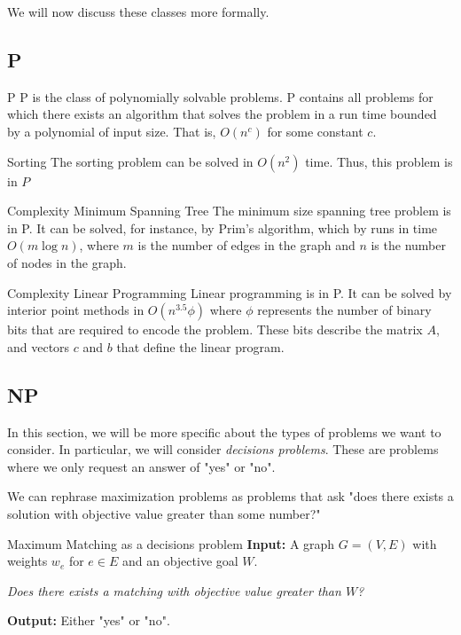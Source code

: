 We will now discuss these classes more formally.
\subsection{P}
\begin{definition}{P}{}
P is the class of polynomially solvable problems.  P contains all problems for which there exists an algorithm that solves the problem in a run time bounded by a polynomial of input size. That is, $O(n^c)$ for some constant $c$.
\end{definition}

\begin{example}{Sorting}{}
The sorting problem can be solved in $O(n^2)$ time.  Thus, this problem is in $P$
\end{example}

\begin{example}{Complexity Minimum Spanning Tree}{}
The minimum size spanning tree problem is in P.  It can be solved, for instance, by Prim's algorithm, which  by runs in time $O(m \log n)$, where $m$ is the number of edges in the graph and $n$ is the number of nodes in the graph.  
\end{example}
\begin{example}{Complexity Linear Programming}{}
Linear programming is in P.  It can be solved by interior point methods in $O(n^{3.5} \phi)$ where $\phi$ represents the number of binary bits that are required to encode the problem.  These bits describe the matrix $A$, and vectors $c$ and $b$ that define the linear program.
\end{example}
\subsection{NP}
In this section, we will be more specific about the types of problems we want to consider.   In particular, we will consider \emph{decisions problems}.  These are problems where we only request an answer of "yes" or "no".

We can rephrase maximization problems as problems that ask "does there exists a solution with objective value greater than some number?"
\begin{example}{Maximum Matching as a decisions problem}{}
\textbf{Input:} A graph $G = (V,E)$ with weights $w_e$ for $e \in E$ and an objective goal $W$.

\begin{center}
\emph{
Does there exists a matching with objective value greater than $W$?}
\end{center}

\textbf{Output:} Either "yes" or "no".
\end{example}

